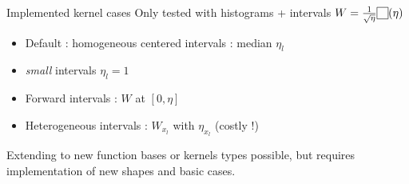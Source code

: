 \documentclass{beamer}
\newcommand\SymSquare{\begin{tikzpicture}[baseline=0.5ex]%
        \draw (0,0) -- (0,1em) -- (1em,1em) -- (1em,0) -- cycle;
\end{tikzpicture}}
\newcommand\Indicator[1]{\SymSquare(#1)}
\begin{document}
\begin{frame}{Implemented kernel cases}
    Only tested with histograms + intervals $W = \frac{1}{\sqrt{\eta}} \Indicator{\eta}$
    \begin{itemize}
        \item Default : homogeneous centered intervals : median $\eta_l$
        \item \emph{small} intervals $\eta_l = 1$
        \item Forward intervals : $W$ at $[0, \eta]$
        \item Heterogeneous intervals : $W_{x_l}$ with $\eta_{x_l}$ (costly !)
    \end{itemize}

    Extending to new function bases or kernels types possible, but requires implementation of new shapes and basic cases.
\end{frame}
\end{document}

